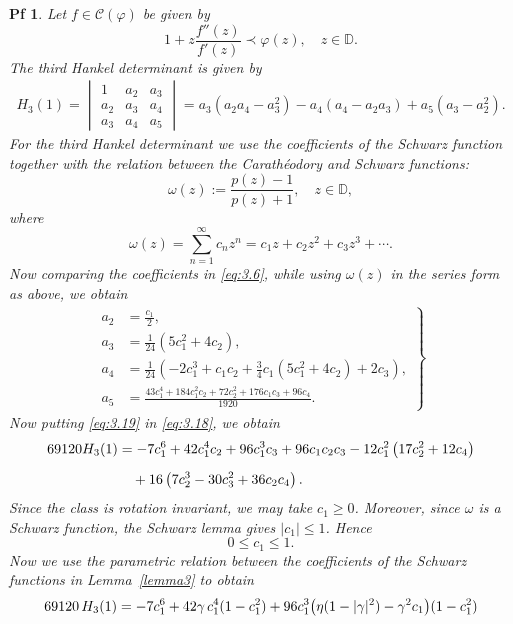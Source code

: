 \documentclass[10pt,a4paper]{amsart}
\newtheorem{pf}{Pf}
\begin{document}
\begin{pf}
Let $f\in \mathcal{C}(\varphi)$ be given by 
\[
1+z\frac{f''(z)}{f'(z)} \prec \varphi(z), \quad z\in \mathbb{D}.
\]
The third Hankel determinant is given  by
\begin{align}\label{eq:3.18}
H_3(1) =
\begin{vmatrix}
	1 & a_2 & a_3 \\
	a_2 & a_3 & a_4 \\
	a_3 & a_4 & a_5
\end{vmatrix}
= a_3(a_2 a_4 - a_3^2) - a_4(a_4 - a_2 a_3) + a_5(a_3 - a_2^2).
\end{align}
For the third Hankel determinant we use the coefficients of the Schwarz function together with the relation between the Carath\'eodory and Schwarz functions:
\[
\omega(z):=\frac{p(z)-1}{p(z)+1}, \quad z\in \mathbb{D},
\]
where
\[
\omega(z)=\sum_{n=1}^{\infty}c_n z^n
= c_1 z+c_2 z^2+c_3 z^3+\cdots.
\]
Now comparing the coefficients in \eqref{eq:3.6}, while using  $\omega(z)$ in the series form as above, we obtain
\begin{align}\label{eq:3.19}
\left.
\begin{aligned}
	a_{2} & = \frac{c_{1}}{2},\\[1mm]
	a_{3} & = \frac{1}{24}\left(5c_{1}^{2}+4c_{2}\right),\\[1mm]
	a_{4} & = \frac{1}{24}\left(-2c_{1}^{3}+c_{1}c_{2}+\frac{3}{4}c_{1}\left(5c_{1}^{2}+4c_{2}\right)+2c_{3}\right),\\[1mm]
	a_{5} & = \frac{43c_{1}^{4}+184c_{1}^{2}c_{2}+72c_{2}^{2}+176c_{1}c_{3}+96c_{4}}{1920}.
\end{aligned}
\right\}
\end{align}
Now putting \eqref{eq:3.19} in \eqref{eq:3.18}, we obtain
\begin{align}\label{eq:3.20}
69120 H_{3}(1)&=-7c_{1}^{6}+42c_{1}^{4}c_{2}+96c_{1}^{3}c_{3}+96c_{1}c_{2}c_{3}
-12c_{1}^{2}\left(17c_{2}^{2}+12c_{4}\right)\notag\\[2mm]
&\quad+16\left(7c_{2}^{3}-30c_{3}^{2}+36c_{2}c_{4}\right).
\end{align}
Since the class is rotation invariant, we may take $c_{1} \geq 0$. Moreover, since \(\omega\) is a Schwarz function, the Schwarz lemma gives \(|c_1|\le 1\). Hence
\[
0\le c_1\le 1.
\]
Now we use the parametric relation between the coefficients of the Schwarz functions in Lemma~\ref{lemma3} to obtain
\begin{align}
69120\,  H_{3}(1)&=-7c_{1}^{6}
+42\gamma\,c_{1}^{4}(1-c_{1}^{2})+96c_{1}^{3}\bigl(\eta(1-|\gamma|^{2})-\gamma^{2}c_{1}\bigr)(1-c_{1}^{2})\notag\\

\end{align}
\end{pf}
\end{document}
